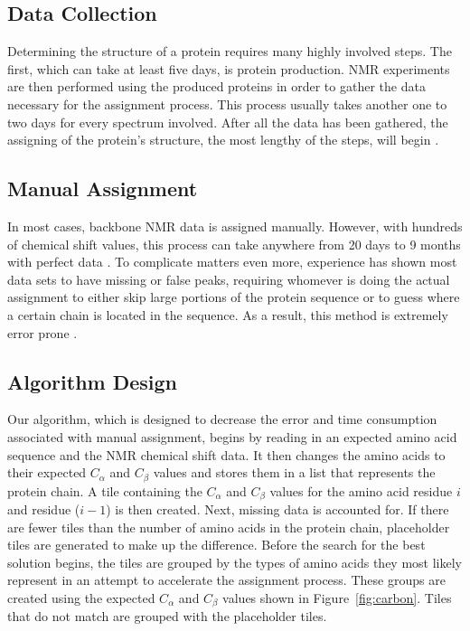 \documentclass[12pt, letter]{article}
\begin{document}
\subsection{Data Collection} %
\label{sub:data_collection}
Determining the structure of a protein requires many highly involved steps. The first, which can take at least five days, is protein production. NMR experiments are then performed using the produced proteins in order to gather the data necessary for the assignment process. This process usually takes another one to two days for every spectrum involved. After all the data has been gathered, the assigning of the protein's structure, the most lengthy of the steps, will begin \cite{babak_alipanahi_error_2011}.

\subsection{Manual Assignment} %
\label{sub:manual_assignment}
In most cases, backbone NMR data is assigned manually. However, with hundreds of chemical shift values, this process can take anywhere from 20 days to 9 months with perfect data \cite{guntert_automated_2009}. To complicate matters even more, experience has shown most data sets to have missing or false peaks, requiring whomever is doing the actual assignment to either skip large portions of the protein sequence or to guess where a certain chain is located in the sequence. As a result, this method is extremely error prone \cite{babak_alipanahi_error_2011}.


\subsection{Algorithm Design} %
\label{sub:algorithm}
Our algorithm, which is designed to decrease the error and time consumption associated with manual assignment, begins by reading in an expected amino acid sequence and the NMR chemical shift data. It then changes the amino acids to their expected $C_\alpha$ and $C_{\beta}$ values and stores them in a list that represents the protein chain. A tile containing the $C_\alpha$ and $C_{\beta}$ values for the amino acid residue $i$ and residue ($i-1$) is then created. Next, missing data is accounted for. If there are fewer tiles than the number of amino acids in the protein chain, placeholder tiles are generated to make up the difference. Before the search for the best solution begins, the tiles are grouped by the types of amino acids they most likely represent in an attempt to accelerate the assignment process. These groups are created using the expected $C_\alpha$ and $C_{\beta}$ values shown in Figure~\ref{fig:carbon}. Tiles that do not match are grouped with the placeholder tiles. 
\end{document}
